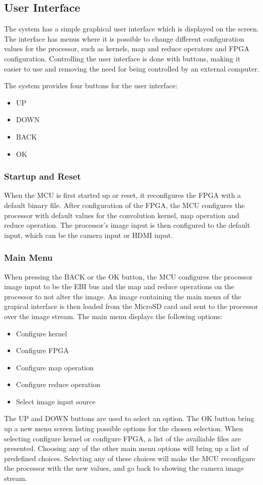 \subsection{User Interface}
The system has a simple graphical user interface which is displayed on the screen. The interface has menus where it is possible to change different configuration values for the processor, such as kernels, map and reduce operators and FPGA configuration. Controlling the user interface is done with buttons, making it easier to use and removing the need for being controlled by an external computer.

The system provides four buttons for the user interface:
\begin{itemize}
	\item UP
	\item DOWN
	\item BACK
	\item OK
\end{itemize}

\subsubsection{Startup and Reset}
When the MCU is first started up or reset, it reconfigures the FPGA with a default binary file. After configuration of the FPGA, the MCU configures the processor with default values for the convolution kernel, map operation and reduce operation. The processor's image input is then configured to the default input, which can be the camera input or HDMI input.

\subsubsection{Main Menu}
When pressing the BACK or the OK button, the MCU configures the processor image input to be the EBI bus and the map and reduce operations on the processor to not alter the image. An image containing the main menu of the grapical interface is then loaded from the MicroSD card and sent to the processor over the image stream. The main menu displays the following options:

\begin{itemize}
	\item Configure kernel
	\item Configure FPGA
	\item Configure map operation
	\item Configure reduce operation
	\item Select image input source
\end{itemize}

The UP and DOWN buttons are used to select an option. The OK button bring up a new menu screen listing possible options for the chosen selection. When selecting configure kernel or configure FPGA, a list of the availiable files are presented. Choosing any of the other main menu options will bring up a list of predefined choices. Selecting any of these choices will make the MCU reconfigure the processor with the new values, and go back to showing the camera image stream.


